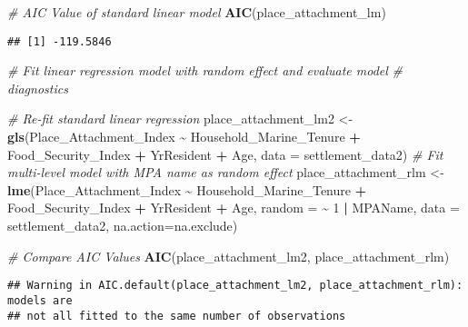 \documentclass[
]{article}
\newenvironment{Shaded}{\begin{snugshade}}{\end{snugshade}}
\newcommand{\AttributeTok}[1]{\textcolor[rgb]{0.13,0.29,0.53}{#1}}
\newcommand{\CommentTok}[1]{\textcolor[rgb]{0.56,0.35,0.01}{\textit{#1}}}
\newcommand{\DecValTok}[1]{\textcolor[rgb]{0.00,0.00,0.81}{#1}}
\newcommand{\FunctionTok}[1]{\textcolor[rgb]{0.13,0.29,0.53}{\textbf{#1}}}
\newcommand{\NormalTok}[1]{#1}
\newcommand{\OtherTok}[1]{\textcolor[rgb]{0.56,0.35,0.01}{#1}}
\newcommand{\SpecialCharTok}[1]{\textcolor[rgb]{0.81,0.36,0.00}{\textbf{#1}}}
\begin{document}
\begin{Shaded}
\begin{Highlighting}[]
\CommentTok{\# AIC Value of standard linear model}
\FunctionTok{AIC}\NormalTok{(place\_attachment\_lm)}
\end{Highlighting}
\end{Shaded}

\begin{verbatim}
## [1] -119.5846
\end{verbatim}

\begin{Shaded}
\begin{Highlighting}[]
\CommentTok{\# Fit linear regression model with random effect and evaluate model}
\CommentTok{\# diagnostics}

\CommentTok{\# Re{-}fit standard linear regression}
\NormalTok{place\_attachment\_lm2 }\OtherTok{\textless{}{-}} \FunctionTok{gls}\NormalTok{(Place\_Attachment\_Index }\SpecialCharTok{\textasciitilde{}} 
\NormalTok{                            Household\_Marine\_Tenure }\SpecialCharTok{+}
\NormalTok{                            Food\_Security\_Index }\SpecialCharTok{+}
\NormalTok{                            YrResident }\SpecialCharTok{+}
\NormalTok{                            Age, }\AttributeTok{data =}\NormalTok{ settlement\_data2)}
\CommentTok{\# Fit multi{-}level model with MPA name as random effect}
\NormalTok{place\_attachment\_rlm }\OtherTok{\textless{}{-}} \FunctionTok{lme}\NormalTok{(Place\_Attachment\_Index }\SpecialCharTok{\textasciitilde{}} 
\NormalTok{                            Household\_Marine\_Tenure }\SpecialCharTok{+}
\NormalTok{                            Food\_Security\_Index }\SpecialCharTok{+}
\NormalTok{                            YrResident }\SpecialCharTok{+}
\NormalTok{                            Age, }\AttributeTok{random =} \SpecialCharTok{\textasciitilde{}} \DecValTok{1} \SpecialCharTok{|}\NormalTok{ MPAName, }\AttributeTok{data =}\NormalTok{ settlement\_data2, }
                            \AttributeTok{na.action=}\NormalTok{na.exclude)}

\CommentTok{\# Compare AIC Values}
\FunctionTok{AIC}\NormalTok{(place\_attachment\_lm2, place\_attachment\_rlm)}
\end{Highlighting}
\end{Shaded}

\begin{verbatim}
## Warning in AIC.default(place_attachment_lm2, place_attachment_rlm): models are
## not all fitted to the same number of observations
\end{verbatim}
\end{document}
